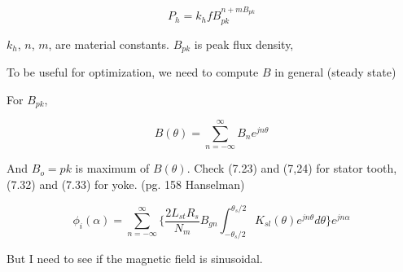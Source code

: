 \documentclass[10pt]{article}
\begin{document}
\begin{equation}
P_h = k_hfB_{pk}^{n+mB_{pk}}
\end{equation}

$k_h$, $n$, $m$, are material constants. $B_{pk}$ is peak flux density,

To be useful for optimization, we need to compute $B$ in general (steady state)

For $B_{pk}$,

\begin{equation}
B(\theta) = \sum_{n=-\infty}^{\infty}B_ne^{jn\theta}
\end{equation}

And $B_o={pk}$ is maximum of $B(\theta)$. Check (7.23) and (7,24) for stator tooth, (7.32) and (7.33) for yoke. (pg. 158 Hanselman)

\begin{equation}
\phi_i(\alpha) = \sum_{n=-\infty}^{\infty}\bigg\{\frac{2L_{st}R_s}{N_m}B_{gn}\int_{-\theta_s/2}^{\theta_s/2}K_{sl}(\theta)e^{jn\theta}d\theta{}\bigg\}e^{jn\alpha}
\end{equation}

But I need to see if the magnetic field is sinusoidal.
\end{document}
